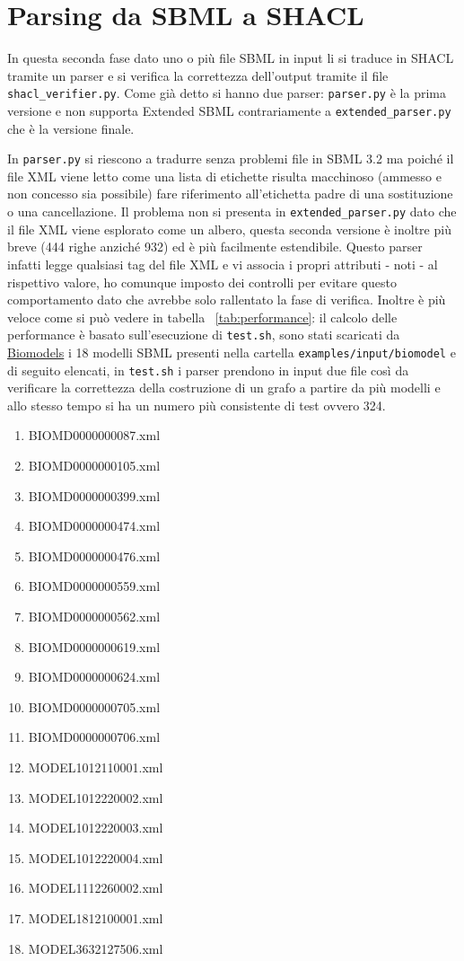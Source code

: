 \documentclass{article}
\begin{document}
\section{Parsing da SBML a SHACL}

In questa seconda fase dato uno o più file SBML in input li si traduce in SHACL tramite un parser e si verifica la correttezza dell'output tramite il file \texttt{shacl\_verifier.py}. Come già detto si hanno due parser: \texttt{parser.py} è la prima versione e non supporta Extended SBML contrariamente a \texttt{extended\_parser.py} che è la versione finale. 

In \texttt{parser.py} si riescono a tradurre senza problemi file in SBML 3.2 ma poiché il file XML viene letto come una lista di etichette risulta macchinoso (ammesso e non concesso sia possibile) fare riferimento all'etichetta padre di una sostituzione o una cancellazione. Il problema non si presenta in \texttt{extended\_parser.py} dato che il file XML viene esplorato come un albero, questa seconda versione è inoltre più breve (444 righe anziché 932) ed è più facilmente estendibile. Questo parser infatti legge qualsiasi tag del file XML e vi associa i propri attributi - noti - al rispettivo valore, ho comunque imposto dei controlli per evitare questo comportamento dato che avrebbe solo rallentato la fase di verifica. Inoltre è più veloce come si può vedere in tabella ~\ref{tab:performance}: il calcolo delle performance è basato sull'esecuzione di \texttt{test.sh}, sono stati scaricati da \href{https://www.ebi.ac.uk/biomodels/}{Biomodels} i 18 modelli SBML presenti nella cartella \texttt{examples/input/biomodel} e di seguito elencati, in \texttt{test.sh} i parser prendono in input due file così da verificare la correttezza della costruzione di un grafo a partire da più modelli e allo stesso tempo si ha un numero più consistente di test ovvero 324. 

\begin{enumerate}
    \item BIOMD0000000087.xml
    \item BIOMD0000000105.xml
    \item BIOMD0000000399.xml
    \item BIOMD0000000474.xml
    \item BIOMD0000000476.xml
    \item BIOMD0000000559.xml
    \item BIOMD0000000562.xml
    \item BIOMD0000000619.xml
    \item BIOMD0000000624.xml
    \item BIOMD0000000705.xml
    \item BIOMD0000000706.xml
    \item MODEL1012110001.xml
    \item MODEL1012220002.xml
    \item MODEL1012220003.xml
    \item MODEL1012220004.xml
    \item MODEL1112260002.xml
    \item MODEL1812100001.xml
    \item MODEL3632127506.xml
\end{enumerate}
\end{document}
